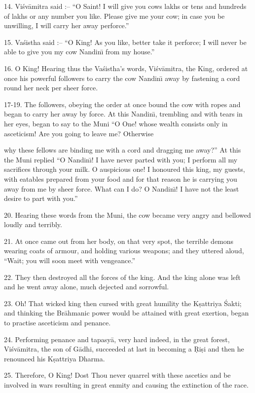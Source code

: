 14. Vi\'sv\=amitra said :-- ``O Saint! I will give you cows lakhs or tens and hundreds of lakhs or any number you like. Please give me your cow; in case you be unwilling, I will carry her away perforce.''

15. Va\'sistha said :-- ``O King! As you like, better take it perforce; I will never be able to give you my cow Nandin\={\i} from my house.''

16. O King! Hearing thus the Va\'sistha's words, Vi\'sv\=amitra, the King, ordered at once his powerful followers to carry the cow Nandin\={\i} away by fastening a cord round her neck per sheer force.

17-19. The followers, obeying the order at once bound the cow with ropes and began to carry her away by force. At this Nandin\={\i}, trembling and with tears in her eyes, began to say to the Muni ``O One! whose wealth consists only in asceticism! Are you going to leave me? Otherwise

why these fellows are binding me with a cord and dragging me away?'' At this the Muni replied ``O Nandin\={\i}! I have never parted with you; I perform all my sacrifices through your milk. O auspicious one! I honoured this king, my guests, with eatables prepared from your food and for that reason he is carrying you away from me by sheer force. What can I do? O Nandin\={\i}! I have not the least desire to part with you.''

20. Hearing these words from the Muni, the cow became very angry and bellowed loudly and terribly.

21. At once came out from her body, on that very spot, the terrible demons wearing coats of armour, and holding various weapons; and they uttered aloud, ``Wait; you will soon meet with vengeance.''

22. They then destroyed all the forces of the king. And the king alone was left and he went away alone, much dejected and sorrowful.

23. Oh! That wicked king then cursed with great humility the K\d{s}attriya \'Sakti; and thinking the Br\=ahmanic power would be attained with great exertion, began to practise asceticism and penance.

24. Performing penance and tapasy\=a, very hard indeed, in the great forest, Vi\'sv\=amitra, the son of G\=adhi, succeeded at last in becoming a \d{R}i\d{s}i and then he renounced his K\d{s}attriya Dharma.

25. Therefore, O King! Dost Thou never quarrel with these ascetics and be involved in wars resulting in great enmity and causing the extinction of the race.

